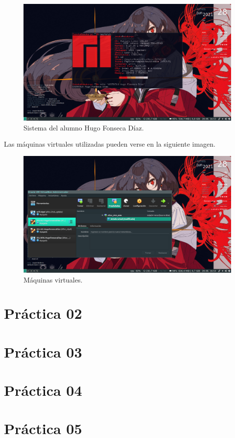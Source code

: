 \documentclass[11pt]{article}
\begin{document}
\begin{figure}[H]
  \caption{Sistema del alumno Hugo Fonseca Díaz.}
  \centering
    \includegraphics[scale=0.4, trim={0 1cm 0 0}, clip]{other/sistema_hugo.png}
\end{figure}

Las máquinas virtuales utilizadas pueden verse en la siguiente imagen.

\begin{figure}[H]
  \caption{Máquinas virtuales.}
  \centering
    \includegraphics[scale=0.4, trim={0 1cm 0 0}, clip]{other/maquinas_virtuales_hugo.png}
\end{figure}

\section{Práctica 02}

\section{Práctica 03}

\section{Práctica 04}

\section{Práctica 05}
\end{document}
